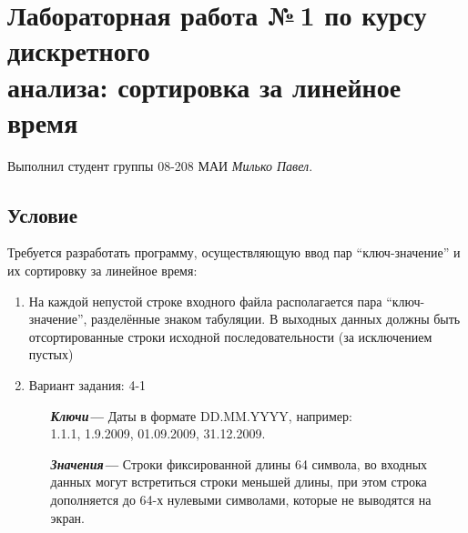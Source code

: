 \documentclass[12pt]{article}
\begin{document}
\section*{Лабораторная работа №\,1 по курсу дискретного\\ анализа: сортировка за линейное время}

Выполнил студент группы 08-208 МАИ \textit{Милько Павел}.
\subsection*{Условие}

Требуется разработать программу, осуществляющую ввод пар ``ключ-значение'' и их сортировку за линейное время: 
\begin{enumerate}
\item На каждой непустой строке входного файла располагается пара ``ключ-значение'', разделённые знаком табуляции. В выходных данных должны быть отсортированные строки исходной последовательности (за исключением пустых)
\item Вариант задания: 4-1
\begin{itemize}

 \item[\textbf{ \it Ключи---}] Даты в формате DD.MM.YYYY, например:\\ 1.1.1, 1.9.2009, 01.09.2009, 31.12.2009.
 \item[\textbf{ \it Значения---}] Строки фиксированной длины 64 символа, во входных данных могут встретиться строки меньшей длины, при этом строка дополняется до 64-х нулевыми символами, которые не выводятся на экран.

\end{itemize}
\end{enumerate}
\end{document}
